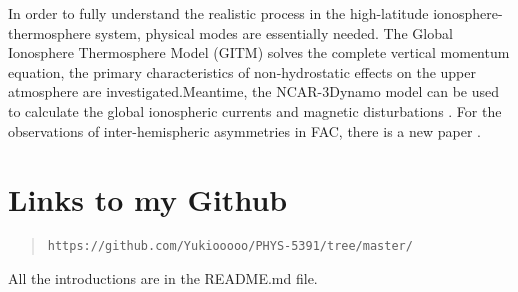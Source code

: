\documentclass[12pt, letterpaper]{article} %
\begin{document}
In order to fully understand the realistic process in the high-latitude ionosphere-
thermosphere system, physical modes are essentially needed. The Global Ionosphere 
Thermosphere Model (GITM) solves the complete vertical momentum equation, the 
primary characteristics of non-hydrostatic effects on the upper atmosphere are 
investigated.Meantime, the NCAR-3Dynamo model can 
be used to calculate the global ionospheric currents and magnetic disturbations 
\citep[see][chap. 5]{Maute2017}. For the observations of inter-hemispheric asymmetries in FAC, there is a new paper \cite[p. 13]{Workayehu2019}. 








\section{Links to my Github} %
\begin{quote} 
\begin{verbatim}
https://github.com/Yukiooooo/PHYS-5391/tree/master/
\end{verbatim} %
\end{quote} %

\noindent All the introductions are in the README.md file. 


\clearpage %

\end{document}

